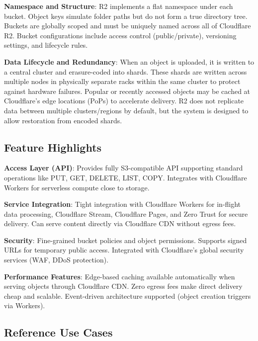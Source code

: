 \textbf{Namespace and Structure}: R2 implements a flat namespace under each bucket. Object keys simulate folder paths but do not form a true directory tree. Buckets are globally scoped and must be uniquely named across all of Cloudflare R2. Bucket configurations include access control (public/private), versioning settings, and lifecycle rules.

\textbf{Data Lifecycle and Redundancy}: When an object is uploaded, it is written to a central cluster and erasure-coded into shards. These shards are written across multiple nodes in physically separate racks within the same cluster to protect against hardware failures. Popular or recently accessed objects may be cached at Cloudflare's edge locations (PoPs) to accelerate delivery. R2 does not replicate data between multiple clusters/regions by default, but the system is designed to allow restoration from encoded shards.

\subsection{Feature Highlights}

\textbf{Access Layer (API)}: Provides fully S3-compatible API supporting standard operations like PUT, GET, DELETE, LIST, COPY. Integrates with Cloudflare Workers for serverless compute close to storage.

\textbf{Service Integration}: Tight integration with Cloudflare Workers for in-flight data processing, Cloudflare Stream, Cloudflare Pages, and Zero Trust for secure delivery. Can serve content directly via Cloudflare CDN without egress fees.

\textbf{Security}: Fine-grained bucket policies and object permissions. Supports signed URLs for temporary public access. Integrated with Cloudflare's global security services (WAF, DDoS protection).

\textbf{Performance Features}: Edge-based caching available automatically when serving objects through Cloudflare CDN. Zero egress fees make direct delivery cheap and scalable. Event-driven architecture supported (object creation triggers via Workers).

\subsection{Reference Use Cases}

